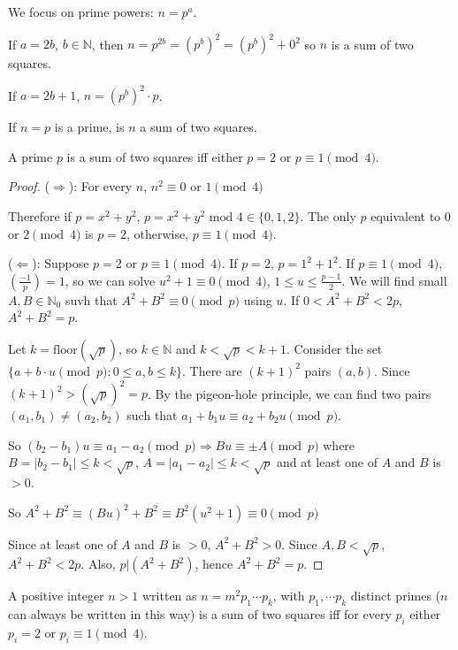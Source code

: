 We focus on prime powers: $n = p^a$.

If $a = 2b$, $b \in \mathbb{N}$, then $n = p^{2b} = (p^b)^2 = (p^b)^2 + 0^2$ so $n$ is a sum of two squares.

If $a = 2b + 1$, $n = (p^b)^2 \cdot p$.

If $n = p$ is a prime, is $n$ a sum of two squares.

\begin{theorem}
	A prime $p$ is a sum of two squares iff either $p = 2$ or $p \equiv 1 \pmod{4}$.
\end{theorem}

\begin{proof}
	($\Rightarrow$):
	For every $n$, $n^2 \equiv 0 \text{ or } 1 \pmod{4}$

	Therefore if $p = x^2 + y^2$, $p = x^2 + y^2 \text{ mod } 4 \in \{0, 1, 2\}$. The only $p$ equivalent to $0$ or $2 \pmod{4}$ is $p = 2$, otherwise, $p \equiv 1 \pmod{4}$.

	($\Leftarrow$):
	Suppose $p = 2$ or $p \equiv 1 \pmod{4}$. If $p = 2$, $p = 1^2 + 1^2$. If $p \equiv 1 \pmod{4}$, $\left(\frac{-1}{p}\right) = 1$, so we can solve $u^2 + 1 \equiv 0 \pmod{4}$, $1 \le u \le \frac{p - 1}{2}$. We will find small $A, B \in \mathbb{N}_0$ suvh that $A^2 + B^2 \equiv 0 \pmod{p}$ using $u$. If $0 < A^2 + B^2 < 2p$, $A^2 + B^2 = p$.

	Let $k = \text{floor}(\sqrt{p})$, so $k \in \mathbb{N}$ and $k < \sqrt{p} < k + 1$. Consider the set $\{a + b \cdot u \pmod{p}: 0 \le a, b \le k\}$. There are $(k + 1)^2$ pairs $(a, b)$. Since $(k + 1)^2 > (\sqrt{p})^2 = p$. By the pigeon-hole principle, we can find two pairs $(a_1, b_1) \ne (a_2, b_2)$ such that $a_1 + b_1 u \equiv a_2 + b_2 u \pmod{p}$.

	So $(b_2 - b_1) u \equiv a_1 - a_2 \pmod{p} \Rightarrow B u \equiv \pm A \pmod{p}$ where $B = |b_2 - b_1| \le k < \sqrt{p}$, $A = |a_1 - a_2| \le k < \sqrt{p}$ and at least one of $A$ and $B$ is $> 0$.

	So $A^2 + B^2 \equiv (B u)^2 + B^2 \equiv B^2 (u^2 + 1) \equiv 0 \pmod{p}$

	Since at least one of $A$ and $B$ is $> 0$, $A^2 + B^2 > 0$. Since $A, B < \sqrt{p}$, $A^2 + B^2 < 2p$. Also, $p | (A^2 + B^2)$, hence $A^2 + B^2 = p$.
\end{proof}

\begin{corollary}
	A positive integer $n > 1$ written as $n = m^2 p_1 \cdots p_k$, with $p_1, \cdots p_k$ distinct primes ($n$ can always be written in this way) is a sum of two squares iff for every $p_i$ either $p_i = 2$ or $p_i \equiv 1 \pmod{4}$.
\end{corollary}

